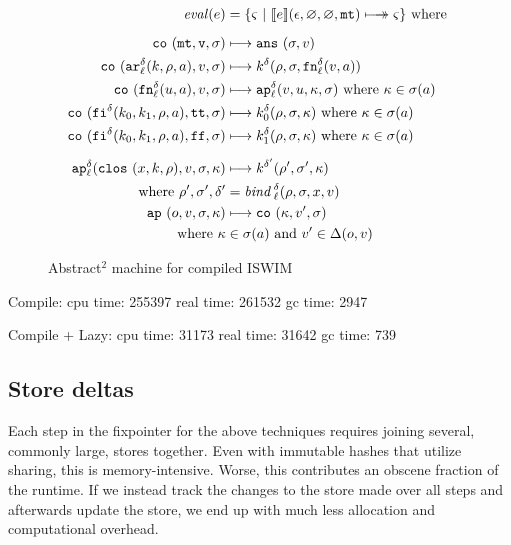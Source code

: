 \documentclass[preprint,onecolumn,9pt]{sigplanconf} %
\begin{document}
\begin{figure}
\begin{align*}
\mathit{eval}(\mexp) &= \{ \mstate\ |\ \compile{\mexp}(\epsilon,\varnothing,\varnothing,\kmt) \multimachstep \mstate \} \text{ where }
\\[2mm]
\co{\kmt,\mval,\msto} &\machstep
\ans{\msto,\mval}
\\
\co{\kar[^\mcntr_\mlab]{\mcomp,\menv,\maddr},\mval,\msto} & \machstep
\mcomp^\mcntr(\menv,\msto,\kfn[^\mcntr_\mlab]{\mval,\maddr})
\\
\co{\kfn[^\mcntr_\mlab]{{\mvalx{u}},\maddr},\mval,\msto} & \machstep
\ap[^\mcntr_\mlab]{\mval,\mvalx{u},\mkont,\msto}
\text{ where }\mkont \in \msto(\maddr)
\\
\co{\kif[^\mcntr]{\mcompi0,\mcompi1,\menv,\maddr},\strue,\msto} & \machstep
\mcompi0^\mcntr(\menv,\msto,\mkont)
\text{ where }\mkont\in\msto(\maddr)
\\
\co{\kif[^\mcntr]{\mcompi0,\mcompi1,\menv,\maddr},\sfalse,\msto} & \machstep
\mcompi1^\mcntr(\menv,\msto,\mkont)
\text{ where }\mkont\in\msto(\maddr)
\\[2mm]
\ap[^\mcntr_\mlab]{\clos{\mvar,\mcomp,\menv},\mval,\msto,\mkont} & \machstep
\mcomp^{\mcntr'}(\menv',\msto',\mkont) \\
\text{ where }\menv',\msto',\mcntr' &= \mathit{bind\,}^{ \mcntr}_\mlab(\menv,\msto,\mvar,\mval)
\\
\ap{\mop,\mval,\msto,\mkont} & \machstep
\co{\mkont,\mval',\msto} \\
\text{ where }\mkont &\in\msto(\maddr)
\text{ and } \mval'\in\interpdelta(\mop,\mval)
\end{align*}
\caption{Abstract$^2$ machine for compiled ISWIM}
\label{fig:caam}
\end{figure}

Compile:
   cpu time: 255397 real time: 261532 gc time: 2947

\noindent
Compile + Lazy:
   cpu time: 31173 real time: 31642 gc time: 739

\newpage

\subsection{Store deltas}

Each step in the fixpointer for the above techniques requires joining
several, commonly large, stores together. Even with immutable hashes
that utilize sharing, this is memory-intensive. Worse, this
contributes an obscene fraction of the runtime. If we instead track
the changes to the store made over all steps and afterwards update the
store, we end up with much less allocation and computational overhead.
\end{document}
